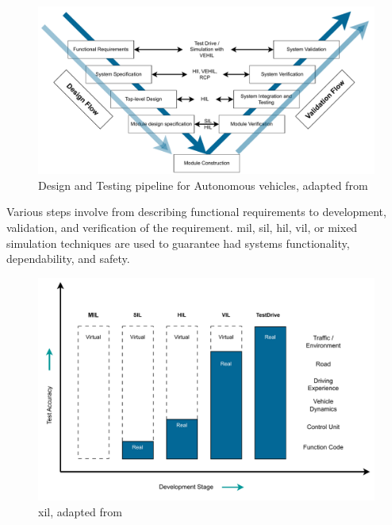 \begin{figure}[htbp]
    \centering
    \includegraphics[width=0.7\linewidth]{97_graphics/related_work/ad_testing.pdf}
    \caption{Design and Testing pipeline for Autonomous vehicles, adapted from \parencite{ad_test_2016}}
    \label{fig:related_work-ad_testing}
\end{figure}

Various steps involve from describing functional requirements to development, validation, and verification of the requirement. \acrfull{mil}, \acrfull{sil}, \acrfull{hil}, \acrfull{vil}, or mixed simulation techniques are used to guarantee \acrshort{had} systems functionality, dependability, and safety.  

\begin{figure}[htbp]
    \centering
    \includegraphics[width=0.7\linewidth]{97_graphics/related_work/x_in_loop_tests.pdf}
    \caption{\acrfull{xil}, adapted from \parencite{x_in_loop_test_compare}}
    \label{fig:related_work-x_in_loop_tests}
\end{figure}


